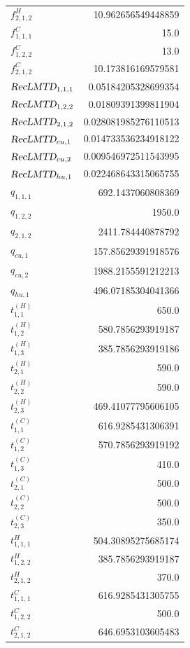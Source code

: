 \documentclass{article}%
\begin{document}
\begin{multicols*}{3}
\begin{supertabular}{lr}
	$f_{2,1,2}^{H}$ & 10.962656549448859 \\%
	$f_{1,1,1}^{C}$ & 15.0 \\%
	$f_{1,2,2}^{C}$ & 13.0 \\%
	$f_{2,1,2}^{C}$ & 10.173816169579581 \\%
	$\textsl{RecLMTD}_{1,1,1}$ & 0.05184205328699354 \\%
	$\textsl{RecLMTD}_{1,2,2}$ & 0.01809391399811904 \\%
	$\textsl{RecLMTD}_{2,1,2}$ & 0.028081985276110513 \\%
	$\textsl{RecLMTD}_{cu,1}$ & 0.014733536234918122 \\%
	$\textsl{RecLMTD}_{cu,2}$ & 0.009546972511543995 \\%
	$\textsl{RecLMTD}_{hu,1}$ & 0.022468643315065755 \\%
	$q_{1,1,1}$ & 692.1437060808369 \\%
	$q_{1,2,2}$ & 1950.0 \\%
	$q_{2,1,2}$ & 2411.784440878792 \\%
	$q_{cu,1}$ & 157.85629391918576 \\%
	$q_{cu,2}$ & 1988.2155591212213 \\%
	$q_{hu,1}$ & 496.07185304041366 \\%
	$t_{1,1}^{(H)}$ & 650.0 \\%
	$t_{1,2}^{(H)}$ & 580.7856293919187 \\%
	$t_{1,3}^{(H)}$ & 385.7856293919186 \\%
	$t_{2,1}^{(H)}$ & 590.0 \\%
	$t_{2,2}^{(H)}$ & 590.0 \\%
	$t_{2,3}^{(H)}$ & 469.41077795606105 \\%
	$t_{1,1}^{(C)}$ & 616.9285431306391 \\%
	$t_{1,2}^{(C)}$ & 570.7856293919192 \\%
	$t_{1,3}^{(C)}$ & 410.0 \\%
	$t_{2,1}^{(C)}$ & 500.0 \\%
	$t_{2,2}^{(C)}$ & 500.0 \\%
	$t_{2,3}^{(C)}$ & 350.0 \\%
	$t_{1,1,1}^{H}$ & 504.30895275685174 \\%
	$t_{1,2,2}^{H}$ & 385.7856293919187 \\%
	$t_{2,1,2}^{H}$ & 370.0 \\%
	$t_{1,1,1}^{C}$ & 616.9285431305755 \\%
	$t_{1,2,2}^{C}$ & 500.0 \\%
	$t_{2,1,2}^{C}$ & 646.6953103605483 \\%

\end{supertabular}
\end{multicols*}
\end{document}
